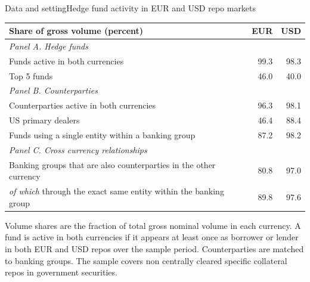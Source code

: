 \documentclass[aspectratio=169,11pt]{beamer}
\begin{document}
\begin{frame}{Data and setting}{Hedge fund activity in EUR and USD repo markets}
  \vspace{-0.6em}
  \begin{center}\scriptsize
  \begin{tabular}{lrr}
    \toprule
    Share of gross volume (percent) & EUR & USD \\
    \midrule
    \multicolumn{3}{l}{\textit{Panel A. Hedge funds}} \\
    Funds active in both currencies & 99.3 & 98.3 \\
    Top 5 funds & 46.0 & 40.0 \\
    \midrule
    \multicolumn{3}{l}{\textit{Panel B. Counterparties}} \\
    Counterparties active in both currencies & 96.3 & 98.1 \\
    US primary dealers & 46.4 & 88.4 \\
    Funds using a single entity within a banking group & 87.2 & 98.2 \\
    \midrule
    \multicolumn{3}{l}{\textit{Panel C. Cross currency relationships}} \\
    Banking groups that are also counterparties in the other currency & 80.8 & 97.0 \\
    \quad \textit{of which} through the exact same entity within the banking group & 89.8 & 97.6 \\
    \bottomrule
  \end{tabular}
  \end{center}
  {\tiny\color{slate} Volume shares are the fraction of total gross nominal volume in each currency. A fund is active in both currencies if it appears at least once as borrower or lender in both EUR and USD repos over the sample period. Counterparties are matched to banking groups. The sample covers non centrally cleared specific collateral repos in government securities.\par}
\end{frame}

\end{document}
